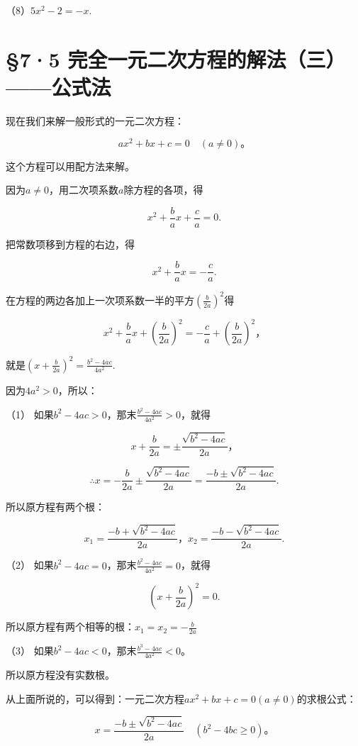 （8）\(5x^{2} - 2 = -x.\)

\section{§7·5 完全一元二次方程的解法（三） ------公式法}

现在我们来解一般形式的一元二次方程：

\[
a x ^ {2} + b x + c = 0 \quad (a \neq 0)\text{。}
\]

这个方程可以用配方法来解。

因为\(a \neq 0\)，用二次项系数\(a\)除方程的各项，得

\[
x ^ {2} + \frac{b}{a} x + \frac{c}{a} = 0.
\]

把常数项移到方程的右边，得

\[
x ^ {2} + \frac{b}{a} x = - \frac{c}{a}.
\]

在方程的两边各加上一次项系数一半的平方\(\left(\frac{b}{2a}\right)^2\)得

\[
x ^ {2} + \frac{b}{a} x + \left(\frac{b}{2 a}\right) ^ {2} = - \frac{c}{a} + \left(\frac{b}{2 a}\right) ^ {2}\text{，}
\]

就是\(\left(x + \frac{b}{2a}\right)^2 = \frac{b^2 - 4ac}{4a^2}.\)

因为\(4a^{2} > 0\)，所以：

（1） 如果\(b^2 - 4ac > 0\)，那末\(\frac{b^2 - 4ac}{4a^2} > 0\)，就得

\[
x + \frac{b}{2 a} = \pm \frac{\sqrt {b ^ {2} - 4 a c}}{2 a}\text{，}
\]

\[
\therefore x = - \frac{b}{2 a} \pm \frac{\sqrt {b ^ {2} - 4 a c}}{2 a} = \frac{- b \pm \sqrt {b ^ {2} - 4 a c}}{2 a}.
\]

所以原方程有两个根：

\[
x _ {1} = \frac{- b + \sqrt {b ^ {2} - 4 a c}}{2 a}\text{，} x _ {2} = \frac{- b - \sqrt {b ^ {2} - 4 a c}}{2 a}.
\]

（2） 如果\(b^2 - 4ac = 0\)，那末\(\frac{b^2 - 4ac}{4a^2} = 0\)，就得

\[
\left(x + \frac{b}{2 a}\right) ^ {2} = 0.
\]

所以原方程有两个相等的根：\(x_{1} = x_{2} = -\frac{b}{2a}\)

（3） 如果\(b^2 - 4ac < 0\)，那末\(\frac{b^3 - 4ac}{4a^2} < 0\)。

所以原方程没有实数根。

从上面所说的，可以得到：一元二次方程\(ax^2 + bx + c = 0 (a \neq 0)\)的求根公式：

\[
x = \frac{- b \pm \sqrt {b ^ {2} - 4 a c}}{2 a} \quad (b ^ {2} - 4 b c \geqslant 0)\text{。}
\]

